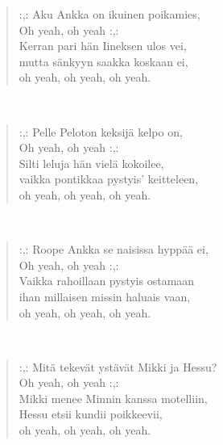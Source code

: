 \noindent\begin{minipage}{\linewidth}
\begin{verse}
	\hspace{0pt-\widthof{:,: }}:,: Aku Ankka on ikuinen poikamies,\\
	Oh yeah, oh yeah :,:\\
	Kerran pari hän Iineksen ulos vei,\\
	mutta sänkyyn saakka koskaan ei,\\
	oh yeah, oh yeah, oh yeah.\\
\end{verse}
\end{minipage}\\[10pt]
\noindent\begin{minipage}{\linewidth}
\begin{verse}
	\hspace{0pt-\widthof{:,: }}:,: Pelle Peloton keksijä kelpo on,\\
	Oh yeah, oh yeah :,:\\
	Silti leluja hän vielä kokoilee,\\
	vaikka pontikkaa pystyis' keitteleen,\\
	oh yeah, oh yeah, oh yeah.\\
\end{verse}
\end{minipage}\\[10pt]
\noindent\begin{minipage}{\linewidth}
\begin{verse}
	\hspace{0pt-\widthof{:,: }}:,: Roope Ankka se naisissa hyppää ei,\\
	Oh yeah, oh yeah :,:\\
	Vaikka rahoillaan pystyis ostamaan\\
	ihan millaisen missin haluais vaan,\\
	oh yeah, oh yeah, oh yeah.\\
\end{verse}
\end{minipage}\\[10pt]
\noindent\begin{minipage}{\linewidth}
\begin{verse}
	\hspace{0pt-\widthof{:,: }}:,: Mitä tekevät ystävät Mikki ja Hessu?\\
	Oh yeah, oh yeah :,:\\
	Mikki menee Minnin kanssa motelliin,\\
	Hessu etsii kundii poikkeevii,\\
	oh yeah, oh yeah, oh yeah.\\
\end{verse}
\end{minipage}\\[10pt]
